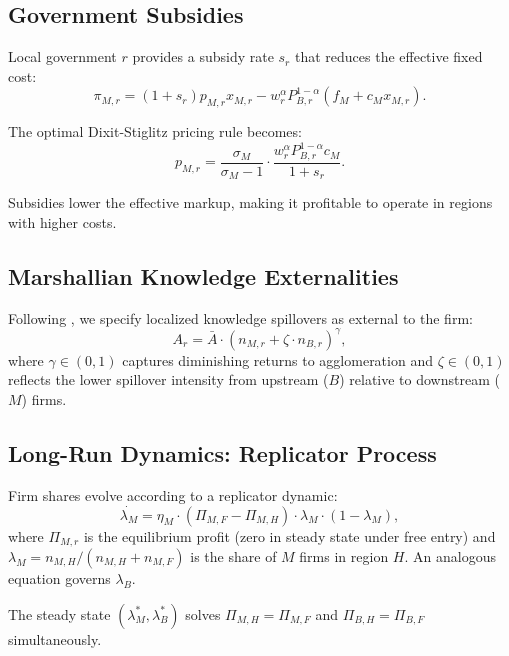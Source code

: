\documentclass[11pt,a4paper]{article}
\newcommand{\sM}{\sigma_M}
\newcommand{\lamM}{\lambda_M}
\newcommand{\lamB}{\lambda_B}
\newcommand{\Abar}{\bar{A}}
\begin{document}
\subsection{Government Subsidies}

Local government $r$ provides a subsidy rate $s_r$ that reduces the effective fixed cost:
\begin{equation}
    \pi_{M,r} = (1+s_r) p_{M,r} x_{M,r} - w_r^\alpha P_{B,r}^{1-\alpha} (f_M + c_M x_{M,r}).
\end{equation}

The optimal Dixit-Stiglitz pricing rule becomes:
\begin{equation}\label{eq:pricing_subsidy}
    p_{M,r} = \frac{\sM}{\sM-1} \cdot \frac{w_r^\alpha P_{B,r}^{1-\alpha} c_M}{1 + s_r}.
\end{equation}

Subsidies lower the effective markup, making it profitable to operate in regions with higher costs.

\subsection{Marshallian Knowledge Externalities}

Following \citet{combes2015agglomeration}, we specify localized knowledge spillovers as external to the firm:
\begin{equation}\label{eq:marshallian}
    A_r = \Abar \cdot (n_{M,r} + \zeta \cdot n_{B,r})^{\gamma},
\end{equation}
where $\gamma \in (0,1)$ captures diminishing returns to agglomeration and $\zeta \in (0,1)$ reflects the lower spillover intensity from upstream ($B$) relative to downstream ($M$) firms.

\subsection{Long-Run Dynamics: Replicator Process}

Firm shares evolve according to a replicator dynamic:
\begin{equation}\label{eq:replicator}
    \dot{\lamM} = \eta_M \cdot (\Pi_{M,F} - \Pi_{M,H}) \cdot \lamM \cdot (1-\lamM),
\end{equation}
where $\Pi_{M,r}$ is the equilibrium profit (zero in steady state under free entry) and $\lamM = n_{M,H}/(n_{M,H}+n_{M,F})$ is the share of $M$ firms in region $H$. An analogous equation governs $\lamB$.

The steady state $(\lamM^*, \lamB^*)$ solves $\Pi_{M,H} = \Pi_{M,F}$ and $\Pi_{B,H} = \Pi_{B,F}$ simultaneously.
\end{document}
